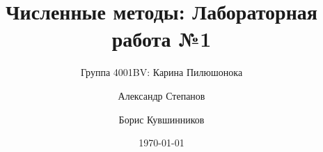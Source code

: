 \documentclass{article}
\title{Численные методы: Лабораторная работа №1}
\author{Группа 4001BV: Карина Пилюшонока \and Александр Степанов \and Борис
Кувшинников}
\date \today
\begin{document}
\maketitle
\newpage
\tableofcontents
\newpage
\section{}
\end{document}
